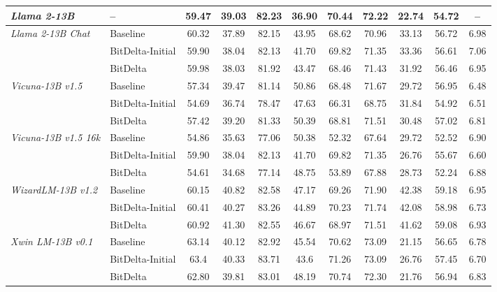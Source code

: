 \documentclass[numbers]{article}
\begin{document}
\begin{table}[htbp]
{\begin{tabular}{@{}llccccccccc@{}}
        \midrule
        \textit{Llama 2-13B} & -- & 59.47 & 39.03 & 82.23 &  36.90  & 70.44 &  72.22 & 22.74 & 54.72 & -- \\
        
        \midrule
        \multirow{3}{*}{\textit{Llama 2-13B Chat}} & Baseline & 60.32 & 37.89 & 82.15 & 43.95 & 68.62 & 70.96 & 33.13 & 56.72 & 6.98 \\
        & BitDelta-Initial & 59.90 & 38.04 & 82.13 & 41.70 & 69.82 & 71.35 & 33.36 & 56.61 & 7.06 \\
        & BitDelta & 59.98 & 38.03 & 81.92 & 43.47 & 68.46   & 71.43 & 31.92 & 56.46 & 6.95 \\

        \midrule
        \multirow{3}{*}{\textit{Vicuna-13B v1.5}} & Baseline & 57.34 & 39.47 & 81.14 & 50.86 & 68.48 & 71.67 & 29.72 & 56.95 & 6.48 \\
        & BitDelta-Initial & 54.69 & 36.74 & 78.47 & 47.63 & 66.31 & 68.75 & 31.84 & 54.92 & 6.51 \\
        & BitDelta & 57.42 & 39.20 & 81.33 & 50.39 & 68.81 & 71.51 & 30.48 & 57.02 & 6.81 \\

        \midrule
        \multirow{3}{*}{\textit{Vicuna-13B v1.5 16k}} & Baseline & 54.86 & 35.63 & 77.06 & 50.38 & 52.32 & 67.64 & 29.72 & 52.52 & 6.90 \\
        & BitDelta-Initial & 59.90 & 38.04 & 82.13 & 41.70 & 69.82 & 71.35 & 26.76 & 55.67 & 6.60 \\
        & BitDelta & 54.61 & 34.68 & 77.14 & 48.75 & 53.89 & 67.88 & 28.73 & 52.24 & 6.88 \\

        \midrule
        \multirow{3}{*}{\textit{WizardLM-13B v1.2}} & Baseline & 60.15 & 40.82 & 82.58 & 47.17 & 69.26 & 71.90 &  42.38 & 59.18 & 6.95 \\
        & BitDelta-Initial & 60.41 & 40.27 & 83.26 & 44.89 & 70.23 & 71.74 & 42.08 & 58.98 & 6.73 \\
        & BitDelta & 60.92  & 41.30 & 82.55 & 46.67 & 68.97 & 71.51 & 41.62 & 59.08 & 6.93 \\

        \midrule
        \multirow{3}{*}{\textit{Xwin LM-13B v0.1}} & Baseline & 63.14 & 40.12 & 82.92 & 45.54 & 70.62 & 73.09 & 21.15 & 56.65 & 6.78 \\
        & BitDelta-Initial & 63.4 & 40.33 & 83.71 & 43.6 & 71.26 & 73.09 & 26.76 & 57.45 & 6.70 \\
        & BitDelta & 62.80 & 39.81 & 83.01 & 48.19 & 70.74 & 72.30 & 21.76 & 56.94 & 6.83 \\


\end{tabular}}
\end{table}
\end{document}
